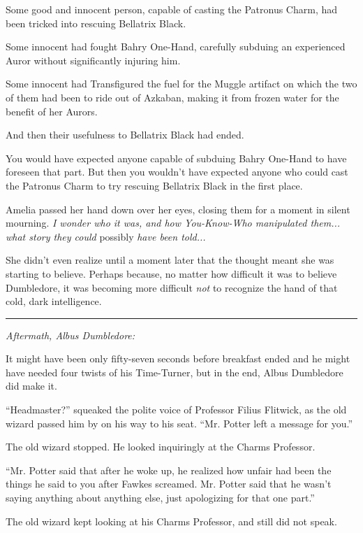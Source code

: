 Some good and innocent person, capable of casting the Patronus Charm,
had been tricked into rescuing Bellatrix Black.

Some innocent had fought Bahry One-Hand, carefully subduing an
experienced Auror without significantly injuring him.

Some innocent had Transfigured the fuel for the Muggle artifact on which
the two of them had been to ride out of Azkaban, making it from frozen
water for the benefit of her Aurors.

And then their usefulness to Bellatrix Black had ended.

You would have expected anyone capable of subduing Bahry One-Hand to
have foreseen that part. But then you wouldn't have expected anyone who
could cast the Patronus Charm to try rescuing Bellatrix Black in the
first place.

Amelia passed her hand down over her eyes, closing them for a moment in
silent mourning. \emph{I wonder who it was, and how You-Know-Who
manipulated them... what story they could} possibly \emph{have been
told...}

She didn't even realize until a moment later that the thought meant she
was starting to believe. Perhaps because, no matter how difficult it was
to believe Dumbledore, it was becoming more difficult \emph{not} to
recognize the hand of that cold, dark intelligence.

\begin{center}\rule{3in}{0.4pt}\end{center}

\emph{Aftermath, Albus Dumbledore:}

It might have been only fifty-seven seconds before breakfast ended and
he might have needed four twists of his Time-Turner, but in the end,
Albus Dumbledore did make it.

``Headmaster?'' squeaked the polite voice of Professor Filius Flitwick,
as the old wizard passed him by on his way to his seat. ``Mr. Potter
left a message for you.''

The old wizard stopped. He looked inquiringly at the Charms Professor.

``Mr. Potter said that after he woke up, he realized how unfair had been
the things he said to you after Fawkes screamed. Mr. Potter said that he
wasn't saying anything about anything else, just apologizing for that
one part.''

The old wizard kept looking at his Charms Professor, and still did not
speak.

